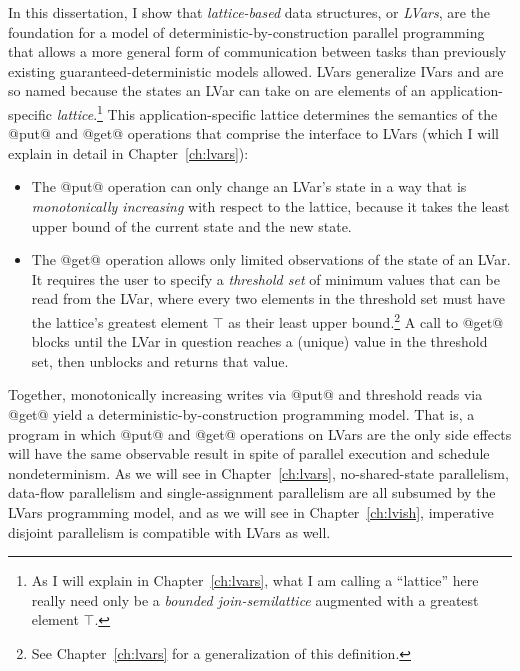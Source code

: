 In this dissertation, I show that \emph{lattice-based} data
structures, or \emph{LVars}, are the foundation for a model of
deterministic-by-construction parallel programming that allows a more
general form of communication between tasks than previously existing
guaranteed-deterministic models allowed.  LVars generalize IVars and
are so named because the states an LVar can take on are elements of an
application-specific \emph{lattice}.\footnote{As I will explain in
  Chapter~\ref{ch:lvars}, what I am calling a ``lattice'' here really
  need only be a {\em bounded join-semilattice} augmented with a
  greatest element $\top$.}  This application-specific lattice
determines the semantics of the @put@ and @get@ operations that
comprise the interface to LVars (which I will explain in detail in
Chapter~\ref{ch:lvars}):
\begin{itemize}
\item The @put@ operation can only change an LVar's state in a way
  that is {\em monotonically increasing} with respect to the lattice,
  because it takes the least upper bound of the current state and the
  new state.
\item The @get@ operation allows only limited observations of the
  state of an LVar.  It requires the user to specify a \emph{threshold
    set} of minimum values that can be read from the LVar, where every
  two elements in the threshold set must have the lattice's greatest
  element $\top$ as their least upper bound.\footnote{See
    Chapter~\ref{ch:lvars} for a generalization of this
    definition.}  A call to @get@ blocks until the
  LVar in question reaches a (unique) value in the threshold set, then
  unblocks and returns that value.
\end{itemize}
Together, monotonically increasing writes via @put@ and threshold
reads via @get@ yield a deterministic-by-construction programming
model.  That is, a program in which @put@ and @get@ operations on
LVars are the only side effects will have the same observable result
in spite of parallel execution and schedule nondeterminism.   As we will see in
Chapter~\ref{ch:lvars}, no-shared-state parallelism, data-flow
parallelism and single-assignment parallelism are all subsumed by the
LVars programming model, and as we will see in
Chapter~\ref{ch:lvish},
imperative disjoint parallelism is compatible with LVars as well.

